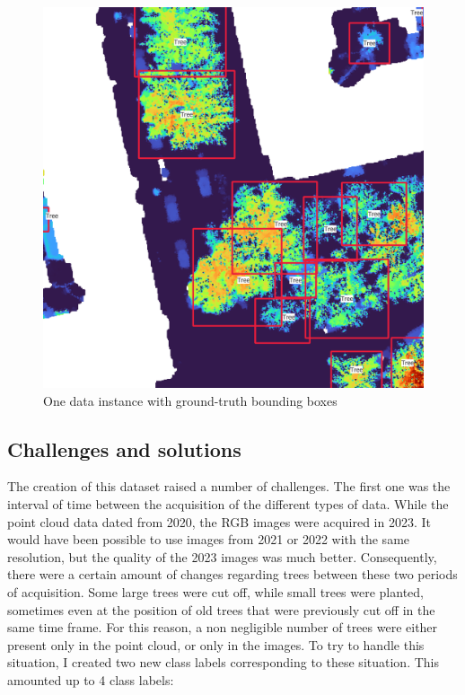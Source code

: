\documentclass[
  letterpaper,
  DIV=11,
  numbers=noendperiod]{scrartcl}
\begin{document}
\begin{figure}
\begin{minipage}{0.48\linewidth}
\includegraphics{images/Training_image/CHM_all_color.png}

\end{minipage}%

\caption{\label{fig-dataset-gt-boxes}One data instance with ground-truth
bounding boxes}

\end{figure}%

\subsection{Challenges and solutions}\label{sec-dataset-challenges}

The creation of this dataset raised a number of challenges. The first
one was the interval of time between the acquisition of the different
types of data. While the point cloud data dated from 2020, the RGB
images were acquired in 2023. It would have been possible to use images
from 2021 or 2022 with the same resolution, but the quality of the 2023
images was much better. Consequently, there were a certain amount of
changes regarding trees between these two periods of acquisition. Some
large trees were cut off, while small trees were planted, sometimes even
at the position of old trees that were previously cut off in the same
time frame. For this reason, a non negligible number of trees were
either present only in the point cloud, or only in the images. To try to
handle this situation, I created two new class labels corresponding to
these situation. This amounted up to 4 class labels:
\end{document}
